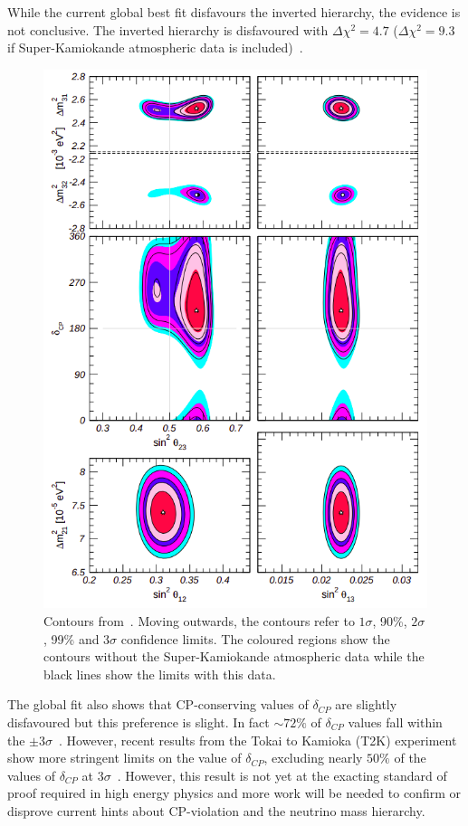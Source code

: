 While the current global best fit disfavours the inverted hierarchy, the evidence is not conclusive.
The inverted hierarchy is disfavoured with $\Delta \chi^{2}=4.7$ ($\Delta \chi^{2}=9.3$ if Super-Kamiokande atmospheric data is included)~\cite{nufit4}.

\begin{figure}[h]
  \centering
  \includegraphics[width=.75\linewidth]{files/figures/theory/nufit4Contours}
  \caption{Contours from~\cite{nufit4}. Moving outwards, the contours refer to $1\sigma$, 90\%, $2\sigma$, 99\% and $3\sigma$ confidence limits. The coloured regions show the contours without the Super-Kamiokande atmospheric data while the black lines show the limits with this data.}
  \label{fig:nufit4Contours}
\end{figure}

The global fit also shows that CP-conserving values of $\delta_{CP}$ are slightly disfavoured but this preference is slight.
In fact $\sim72\%$ of $\delta_{CP}$ values fall within the $\pm3\sigma$~\cite{nufit4}.
However, recent results from the Tokai to Kamioka (T2K) experiment show more stringent limits on the value of $\delta_{CP}$, excluding nearly $50\%$ of the values of $\delta_{CP}$ at $3\sigma$~\cite{t2kRecent}.
However, this result is not yet at the exacting standard of proof required in high energy physics and more work will be needed to confirm or disprove current hints about CP-violation and the neutrino mass hierarchy.

